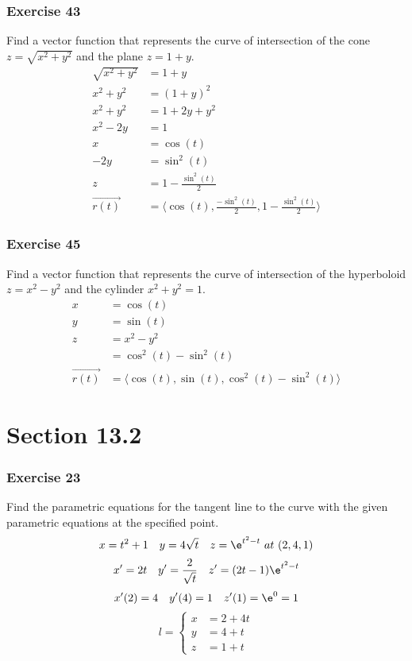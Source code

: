 \documentclass{math}
\begin{document}
\subsubsection*{Exercise 43}
Find a vector function that represents the curve of intersection of the cone
\( z = \sqrt{x^2+y^2} \) and the plane \( z = 1+y \).
\begin{align*}
  \sqrt{x^2+y^2} &= 1+y \\
  x^2+y^2 &= (1+y)^2 \\
  x^2+y^2 &= 1+2y+y^2 \\
  x^2-2y &= 1 \\
  x &= \cos(t) \\
  -2y &= \sin^2(t) \\
  z &= 1-\frac{\sin^2(t)}{2} \\
  \overrightarrow{r(t)} &=
    \langle\cos(t),\frac{-\sin^2(t)}{2},1-\frac{\sin^2(t)}{2}\rangle
\end{align*}

\subsubsection*{Exercise 45}
Find a vector function that represents the curve of intersection of the
hyperboloid \( z = x^2-y^2 \) and the cylinder \( x^2+y^2 = 1 \).
\begin{align*}
  x &= \cos(t) \\
  y &= \sin(t) \\
  z &= x^2-y^2 \\
  &= \cos^2(t)-\sin^2(t) \\
  \overrightarrow{r(t)} &= \langle\cos(t),\sin(t),\cos^2(t)-\sin^2(t)\rangle
\end{align*}

\section*{Section 13.2}

\subsubsection*{Exercise 23}
Find the parametric equations for the tangent line to the curve with the
given parametric equations at the specified point.
\[ x = t^2+1 \quad y = 4\sqrt{t} \quad z = \e^{t^2-t}\ at\ (2,4,1) \]
\[ x' = 2t \quad y' = \frac{2}{\sqrt{t}} \quad z' = (2t-1)\e^{t^2-t} \]
\[ x'(2) = 4 \quad y'(4) = 1 \quad z'(1) = \e^0 = 1 \]
\[ l = \begin{cases}
  x &= 2+4t \\
  y &= 4+t \\
  z &= 1+t
\end{cases} \]
\end{document}
